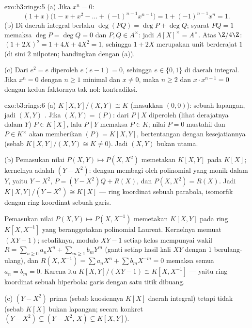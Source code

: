 \begin{solution}{exo:b3:rings:5}
(a) Jika $x^n = 0$:
\[
(1 + x)\bigl(1 - x + x^2 - \dots + (-1)^{n-1}x^{n-1}\bigr)
= 1 + (-1)^{n-1}x^n = 1 .
\]
(b) Di daerah integral berlaku $\deg(PQ) = \deg P + \deg Q$; syarat $PQ = 1$ memaksa
$\deg P = \deg Q = 0$ dan $P, Q \in A^\times$: jadi $A[X]^\times =
A^\times$. Atas $\Z/4\Z$: $(1 + 2X)^2 = 1 + 4X + 4X^2 = 1$, sehingga $1
+ 2X$ merupakan unit berderajat $1$ (di sini $2$ nilpoten; bandingkan
dengan (a)).

(c) Dari $e^2 = e$ diperoleh $e(e - 1) = 0$, sehingga $e \in \{0, 1\}$ di
daerah integral. Jika $x^n = 0$ dengan $n \geq 1$ minimal dan $x \ne 0$, maka
$n \geq 2$ dan $x \cdot x^{n-1} = 0$ dengan kedua faktornya tak nol:
kontradiksi.
\end{solution}

\begin{solution}{exo:b3:rings:6}
(a) $K[X,Y]/(X,Y) \cong K$ (masukkan $(0,0)$): sebuah lapangan, jadi
$(X,Y)$ . Jika $(X, Y) = (P)$: dari $P \mid X$ diperoleh (lihat derajatnya
dalam $Y$) $P \in K[X]$, lalu $P \mid Y$ memaksa $P \in K$; nilai $P =
0$ mustahil dan $P \in K^\times$ akan memberikan $(P) = K[X,Y]$,
bertentangan dengan kesejatiannya (sebab $K[X,Y]/(X,Y) \cong K \neq 0$). Jadi
$(X,Y)$ bukan  utama.

(b) Pemasukan nilai $P(X, Y) \mapsto P(X, X^2)$ memetakan $K[X,Y]$ pada
$K[X]$; kernelnya adalah $(Y - X^2)$: dengan membagi oleh polinomial yang
monik dalam $Y$, yaitu $Y - X^2$, $P = (Y - X^2)Q + R(X)$, dan $P(X, X^2) =
R(X)$. Jadi $K[X,Y]/(Y - X^2) \cong K[X]$ --- ring koordinat sebuah
parabola, isomorfik dengan ring koordinat sebuah garis.

Pemasukan nilai $P(X, Y) \mapsto P(X, X^{-1})$ memetakan $K[X, Y]$ pada
ring $K[X, X^{-1}]$ yang beranggotakan polinomial Laurent. Kernelnya memuat
$(XY - 1)$; sebaliknya, modulo $XY - 1$ setiap kelas mempunyai
wakil $R = \sum_{n \geq 0} a_nX^n + \sum_{m \geq 1} b_m
Y^m$ (ganti setiap hasil kali $XY$ dengan $1$ berulang-ulang), dan $R(X,
X^{-1}) = \sum a_n X^n + \sum b_m X^{-m} = 0$ memaksa semua $a_n =
b_m = 0$. Karena itu $K[X, Y]/(XY - 1) \cong K[X, X^{-1}]$ --- yaitu
ring koordinat sebuah hiperbola: garis dengan satu titik dibuang.

(c)  $(Y - X^2)$ prima (sebab kuosiennya $K[X]$ daerah integral) tetapi tidak
 (sebab $K[X]$ bukan lapangan; secara konkret $(Y - X^2) \subsetneq
(Y - X^2,\, X) \subsetneq K[X,Y]$).
\end{solution}

